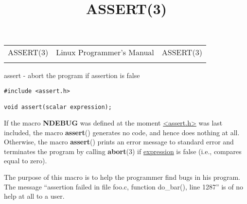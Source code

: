 \documentclass[]{article}
\title{ASSERT(3)}
\author{}
\date{}
\let\realtextbf=\textbf
\renewcommand{\textbf}[1]{\textcolor{boldcolor}{\realtextbf{#1}}}
\renewcommand{\emph}[1]{\underline{#1}}
\begin{document}
\maketitle

\begin{longtable}[c]{@{}lll@{}}
\toprule\addlinespace
ASSERT(3) & Linux Programmer's Manual & ASSERT(3)
\\\addlinespace
\bottomrule
\end{longtable}


assert - abort the program if assertion is false


\begin{verbatim}
#include <assert.h>
 
void assert(scalar expression);
\end{verbatim}


If the macro \textbf{NDEBUG} was defined at the moment
\emph{\textless{}assert.h\textgreater{}} was last included, the macro
\textbf{assert}() generates no code, and hence does nothing at all.
Otherwise, the macro \textbf{assert}() prints an error message to
standard error and terminates the program by calling \textbf{abort}(3)
if \emph{expression} is false (i.e., compares equal to zero).

The purpose of this macro is to help the programmer find bugs in his
program. The message ``assertion failed in file foo.c, function
do\_bar(), line 1287'' is of no help at all to a user.

\end{document}
